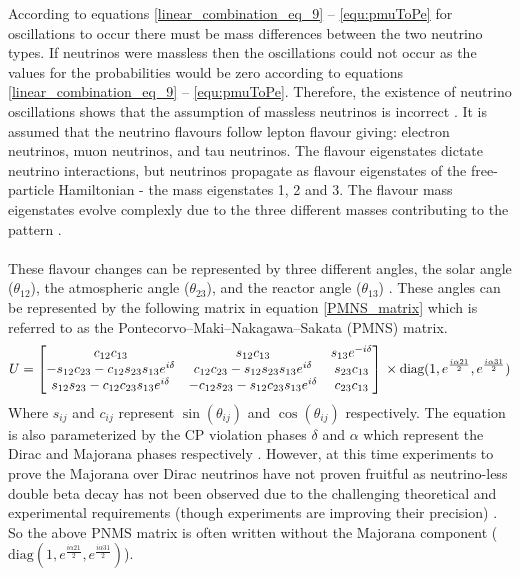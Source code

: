 According to equations \ref{linear_combination_eq_9} -- \ref{equ:pmuToPe} for oscillations to occur there must be mass differences between the two neutrino types. If neutrinos were massless then the oscillations could not occur as the values for the probabilities would be zero according to equations \ref{linear_combination_eq_9} -- \ref{equ:pmuToPe}. Therefore, the existence of neutrino oscillations shows that the assumption of massless neutrinos is incorrect \cite{griffiths2008neutrinoOscillations} \cite{sassaroli1999neutrino}. It is assumed that the neutrino flavours follow lepton flavour giving: electron neutrinos, muon neutrinos, and tau neutrinos. The flavour eigenstates dictate neutrino interactions, but neutrinos propagate as flavour eigenstates of the free-particle Hamiltonian - the mass eigenstates 1, 2 and 3. The flavour mass eigenstates evolve complexly due to the three different masses contributing to the pattern   \cite{griffiths2008neutrinoOscillations}. 
\\\\These flavour changes can be represented by three different angles, the solar angle ($\theta_{12}$), the atmospheric angle ($\theta_{23}$), and the reactor angle ($\theta_{13}$) \cite{Olive_2014}  \cite{griffiths2008neutrinoOscillations}. These angles can be represented by the following  matrix in equation \ref{PMNS_matrix} which is referred to as the Pontecorvo–Maki–Nakagawa–Sakata (PMNS) matrix.
\begin{equation}
U
    =
    \begin{bmatrix}
        c_{12}c_{13} & s_{12}c_{13} & s_{13}e^{-i\delta}\\
        -s_{12}c_{23} - c_{12}s_{23}s_{13}e^{i\delta} & c_{12}c_{23} - s_{12}s_{23}s_{13}e^{i\delta} & s_{23}c_{13} \\
        s_{12}s_{23} - c_{12}c_{23}s_{13}e^{i\delta} & -c_{12}s_{23} - s_{12}c_{23}s_{13}e^{i\delta} & c_{23}c_{13} 
    \end{bmatrix}
    \\ \times \text{diag}(1, e^{\frac{i\alpha21}{2}} , e^{\frac{i\alpha31}{2}})
    \label{PMNS_matrix}
\end{equation}
Where $s_{ij}$ and $c_{ij}$ represent $\sin(\theta_{ij})$ and $\cos(\theta_{ij})$ respectively. The equation is also parameterized by the CP violation phases $\delta$ and $\alpha$ which represent the Dirac and Majorana phases respectively \cite{Olive_2014}. However, at this time experiments to prove the Majorana over Dirac neutrinos have not proven fruitful as neutrino-less double beta decay has not been observed due to the challenging theoretical and experimental requirements (though experiments are improving their precision) \cite{Cardani_2019}.  So the above PNMS matrix is often written without the Majorana component ($\text{diag}(1, e^{\frac{i\alpha21}{2}} , e^{\frac{i\alpha31}{2}})$). 
